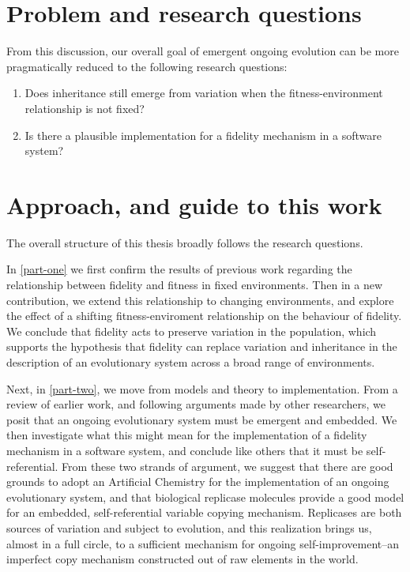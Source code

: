 \documentclass[]{report}
\begin{document}
\section{Problem and research questions}\label{research-questions}

From this discussion, our overall goal of emergent ongoing evolution can be more pragmatically reduced to the following research questions:

\begin{enumerate}[label=RQ\arabic*:]
	\item Does inheritance still emerge from variation when the fitness-environment relationship is not fixed?
	\item Is there a plausible implementation for a fidelity mechanism in a software system?
\end{enumerate}

\section{Approach, and guide to this work}

The overall structure of this thesis broadly follows the research questions. 

In \ref{part-one} we first confirm the results of previous work regarding the relationship between fidelity and fitness in fixed environments. Then in a new contribution, we extend this relationship to changing environments, and explore the effect of a shifting fitness-enviroment relationship on the behaviour of fidelity. We conclude that fidelity acts to preserve variation in the population, which supports the hypothesis that fidelity can replace variation and inheritance in the description of an evolutionary system across a broad range of environments.

Next, in \ref{part-two}, we move from models and theory to implementation. From a review of earlier work, and following arguments made by other researchers, we posit that an ongoing evolutionary system must be emergent and embedded. We then investigate what this might mean for the implementation of a fidelity mechanism in a software system, and conclude like others that it must be self-referential. From these two strands of argument, we suggest that there are good grounds to adopt an Artificial Chemistry for the implementation of an ongoing evolutionary system, and that biological replicase molecules provide a good model for an embedded, self-referential variable copying mechanism. Replicases are both sources of variation and subject to evolution, and this realization brings us, almost in a full circle, to a sufficient mechanism for ongoing self-improvement--an imperfect copy mechanism constructed out of raw elements in the world.
\end{document}
